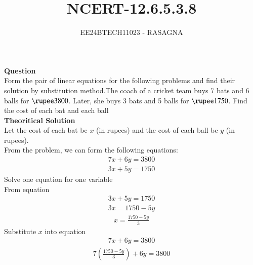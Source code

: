 \documentclass[journal]{IEEEtran}
\begin{document}

\vspace{3cm}

\title{NCERT-12.6.5.3.8}
\author{EE24BTECH11023 - RASAGNA}

{\let\newpage\relax\maketitle}

\renewcommand{\thefigure}{\theenumi}
\renewcommand{\thetable}{\theenumi}
\setlength{\intextsep}{10pt} %


\renewcommand{\thetable}{\theenumi}
\textbf{Question}\\
Form the pair of linear equations for the following problems and find their solution by
substitution method.The coach of a cricket team buys 7 bats and 6 balls for \(\text{\rupee} 3800\). Later, she buys 3 bats and 5 balls for \(\text{\rupee} 1750\). Find the cost of each bat and each ball\\
\textbf{Theoritical Solution}\\
Let the cost of each bat be \(x\) (in rupees) and the cost of each ball be \(y\) (in rupees).\\
From the problem, we can form the following equations:
\begin{align}
    7x + 6y = 3800 
\end{align}
\begin{align}
        3x + 5y = 1750 
\end{align}
Solve one equation for one variable\\
From equation 
\begin{align}
    3x + 5y = 1750 
\end{align}
\begin{align}
        3x = 1750 - 5y
\end{align}
\begin{align}
        x = \frac{1750 - 5y}{3} 
\end{align}
Substitute \(x\) into equation 
\begin{align}
    7x + 6y = 3800
\end{align}
\begin{align}
        7 \left( \frac{1750 - 5y}{3} \right) + 6y= 3800 
\end{align}
\end{document}
